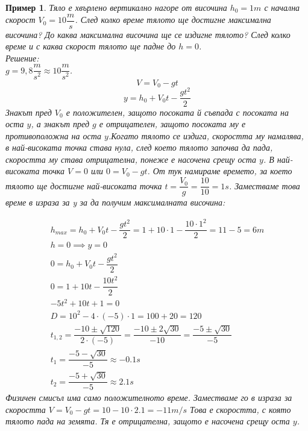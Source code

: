 \documentclass[fleqn, 12pt]{article}
\newtheorem{example}{Пример}[subsection]
\begin{document}
\begin{example}
Тяло е хвърлено вертикално нагоре от височина $h_0 = 1m$ с начална скорост $V_0 = 10 \dfrac{m}{s}$. След колко време тялото ще достигне максимална височина? До каква максимална височина ще се издигне тялото? След колко време и с каква скорост тялото ще падне до $h = 0$. \\
Решение: \\
$g = 9,8 \dfrac{m}{s^2} \approx 10 \dfrac{m}{s^2}$. \\
$$V = V_0 - gt$$
$$y = h_0 + V_0t - \dfrac{gt^2}{2}$$
Знакът пред $V_0$ е положителен, защото посоката й съвпада с посоката на оста $y$, а знакът пред $g$ е отрицателен, защото посоката му е противоположна на оста $y$.Когато тялото се издига, скоростта му намалява, в най-високата точка става нула, след което тялото започва да пада, скоростта му става отрицателна, понеже е насочена срещу оста $y$. В най-високата точка $V = 0$  или $0 = V_0 - gt$. От тук намираме времето, за което тялото ще достигне най-високата точка $t = \dfrac{V_0}{g} = \dfrac{10}{10} = 1s$. Заместваме това време в израза за y за да получим максималната височина:

\begin{gather*}
h_{max} = h_0 + V_0t -  \dfrac{gt^2}{2} = 1+ 10 \cdot 1 -  \dfrac{10 \cdot 1^2}{2} = 11 - 5 = 6m\\
h = 0  \implies y = 0\\
0 = h_0 + V_0t - \dfrac{gt^2}{2} \\
0 = 1 + 10t -  \dfrac{10t^2}{2}\\
-5t^2 + 10t  + 1 = 0 \\
D = 10^2 - 4 \cdot (-5) \cdot 1 = 100 + 20 = 120 \\
t_{1,2} = \dfrac{-10 \pm \sqrt{120}}{2 \cdot (-5)} = \dfrac{-10 \pm 2\sqrt{30}}{-10} = \dfrac{-5 \pm \sqrt{30}}{-5}\\
t_1 = \dfrac{-5 -\sqrt{30}}{-5} \approx -0.1 s\\
t_2 = \dfrac{-5 +\sqrt{30}}{-5} \approx 2.1 s
\end{gather*}
Физичен смисъл има само положителното време. Заместваме го в израза за скоростта $V = V_0 - gt = 10 - 10 \cdot 2.1 = -11 m/s$ Това е скоростта, с която тялото пада на земята. Тя е отрицателна, защото е насочена срещу оста $y$.
\end{example}
\end{document}

